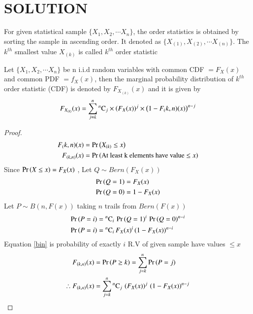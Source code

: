 \documentclass[journal,12pt,twocolumn]{IEEEtran}
\begin{document}
\section{SOLUTION}
\begin{definition}
For given statistical sample $\{X_1, X_2,\cdots X_n\}$, the order statistics is obtained by sorting the
sample in ascending order. It denoted as $\{X_{(1)}, X_{(2)},\cdots X_{(n)}\}$. The $k^{th}$ smallest value
$X_{(k)}$ is called  $k^{th}$ order statistic 
\end{definition}
\begin{theorem}
Let $\{X_1, X_2, \cdots X_n\}$ be n i.i.d random variables with common CDF $= F_{X}(x)$ and common PDF $= f_{X}(x)$, 
then the marginal probability distribution of $k^{th}$ order statistic (CDF) is denoted by $F_{X_{(k)}}(x)$ 
and it is given by
\begin{align}
F_{X_{(k)}}(x) =  \sum_{j=k}^{n}{}^{n}\mathrm{C}_{j}\times \left(F_{X}(x)\right)^{j}\times\left(1-F_(k,n)(x)\right)^{n-j} \label{eqn_1}
\end{align}
\label{th1}
\end{theorem}
\begin{proof}
\begin{align}
F_(k,n)(x) &= \Pr\left(X_{(k)}\leq x\right) \\
F_{(k,n)}(x) &= \Pr\left(\text{At least k elements have value $\leq x$}\right) \label{kcdf}
\end{align}
Since $\Pr\left(X\leq x\right) = F_{X}(x)$ , Let $ Q \sim Bern(F_{X}(x))$
\begin{align}
\Pr\left(Q=1\right) &= F_{X}(x) \\
\Pr\left(Q=0\right) &= 1-F_{X}(x)
\end{align}
Let $P \sim B(n,F(x))$ taking $n$ trails from $Bern(F(x))$    
\begin{align}
\Pr\left(P=i\right) &= {}^{n}\mathrm{C}_{i}\,\Pr\left(Q=1\right)^{i}\,\Pr\left(Q=0\right)^{n-i} \\
\Pr\left(P=i\right) &= {}^{n}\mathrm{C}_{i}\,F_{X}(x)^{i}\,(1-F_{X}(x))^{n-i}\label{bin}  
\end{align}
Equation \eqref{bin} is probability of exactly $i$ R.V of given sample have values $\leq x$   
\begin{align}
 F_{(k,n)}(x) &= \Pr\left(P\geq k\right) =  \sum_{j=k}^{n} \Pr\left(P=j\right) \\
\therefore F_{(k,n)}(x) &=  \sum_{j=k}^{n}{}^{n}\mathrm{C}_{j}\, \left(F_{X}(x)\right)^{j}\,\left(1-F_{X}(x)\right)^{n-j} 
\end{align}
\end{proof}
\end{document}
